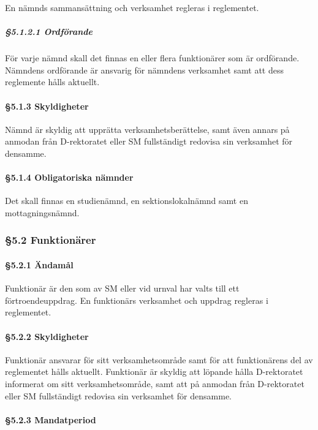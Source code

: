En nämnds sammansättning och verksamhet regleras i reglementet.

\subparagraph{§5.1.2.1 Ordförande}

För varje nämnd skall det finnas en eller flera funktionärer som är ordförande. Nämndens ordförande är ansvarig för nämndens verksamhet samt att dess reglemente hålls aktuellt.

\paragraph{§5.1.3 Skyldigheter}

Nämnd är skyldig att upprätta verksamhetsberättelse, samt även annars på anmodan från D-rektoratet eller SM fullständigt redovisa sin verksamhet för densamme.

\paragraph{§5.1.4 Obligatoriska nämnder}

Det skall finnas en studienämnd, en sektionslokalnämnd samt en mottagningsnämnd.

\subsubsection{§5.2 Funktionärer}

\paragraph{§5.2.1 Ändamål}

Funktionär är den som av SM eller vid urnval har valts till ett förtroendeuppdrag. En funktionärs verksamhet och uppdrag regleras i reglementet.

\paragraph{§5.2.2 Skyldigheter}

Funktionär ansvarar för sitt verksamhetsområde samt för att funktionärens del av reglementet hålls aktuellt. Funktionär är skyldig att löpande hålla D-rektoratet informerat om sitt verksamhetsområde, samt att på anmodan från D-rektoratet eller SM fullständigt redovisa sin verksamhet för densamme.

\paragraph{§5.2.3 Mandatperiod}

